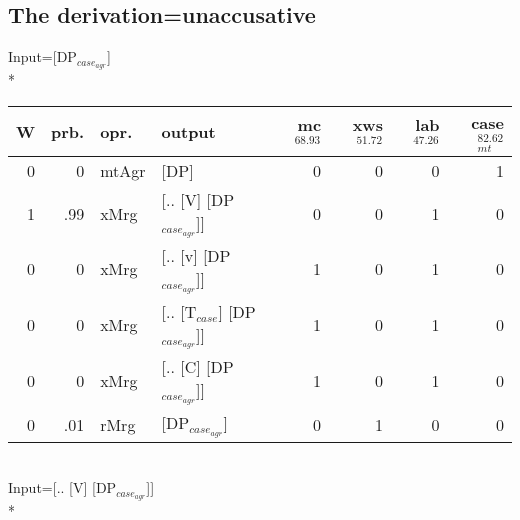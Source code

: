 \subsection{The derivation=unaccusative}
\begingroup\scriptsize Input=[DP$_{case_{agr}}$]\\*
\begin{tabularx}{\linewidth}{rrlXrrrr}
\hline
   W &   prb. & opr.    & output                      &   mc$^{68.93}$ &   xws$^{51.72}$ &   lab$^{47.26}$ &   case$_{mt}^{82.62}$ \\
\hline
   0 &   0 & mtAgr & [DP]                        &            0 &             0 &             0 &                 1 \\
   1 &   .99 & xMrg  & [.. [V] [DP$_{case_{agr}}$]]      &            0 &             0 &             1 &                 0 \\
   0 &   0 & xMrg  & [.. [v] [DP$_{case_{agr}}$]]      &            1 &             0 &             1 &                 0 \\
   0 &   0 & xMrg  & [.. [T$_{case}$] [DP$_{case_{agr}}$]] &            1 &             0 &             1 &                 0 \\
   0 &   0 & xMrg  & [.. [C] [DP$_{case_{agr}}$]]      &            1 &             0 &             1 &                 0 \\
   0 &   .01 & rMrg  & [DP$_{case_{agr}}$]               &            0 &             1 &             0 &                 0 \\
\hline
\end{tabularx}\endgroup\\
\begingroup\scriptsize Input=[.. [V] [DP$_{case_{agr}}$]]\\*
